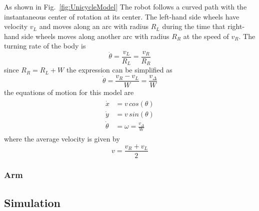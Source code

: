 As shown in Fig.~\ref{fig:UnicycleModel} The robot follows a curved path with the instantaneous center of rotation at its center.
The left-hand side wheels have velocity $v_L$ and moves along an arc with radius $R_L$ during the time that right-hand side wheels moves along another arc with radius $R_R$ at the speed of $v_R$.
The turning rate of the body is
\begin{equation*}
\dot{\theta}= \frac{v_L}{R_L} = \frac{v_R}{R_R}
\end{equation*}
since $R_R = R_L + W$ the expression can be simplified as
\begin{equation}
\dot{\theta}= \frac{v_R - v_L}{W} = \frac{v_\Delta}{W}\label{eq:ThetaDot}
\end{equation}
the equations of motion for this model are
\begin{eqnarray}
\begin{aligned}
\dot{x} &= v\,cos(\theta)\\
\dot{y} &= v\,sin(\theta)\\
\dot{\theta} &= \omega = \frac{v_\Delta}{W}
\end{aligned}
\label{eq:MotionEq}
\end{eqnarray}
where the average velocity \parencite{Corke2011} is given by
\begin{equation}
v = \frac{v_R + v_L}{2}
\label{eq:av_velocity}
\end{equation}

\subsubsection{Arm}

\subsection{Simulation}
